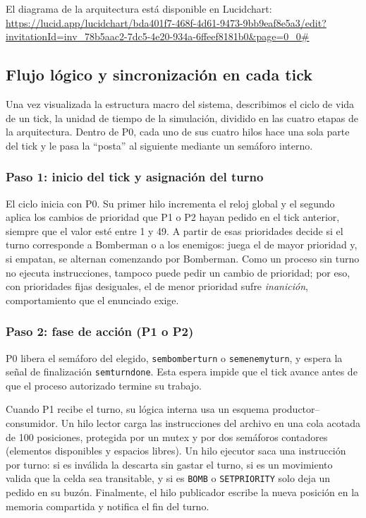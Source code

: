 \documentclass[11pt,a4paper]{article}
\newcommand{\cod}[1]{\texttt{#1}}
\renewcommand{\_}{\textunderscore\allowbreak}
\begin{document}
El diagrama de la arquitectura está disponible en Lucidchart:\\
\small\url{https://lucid.app/lucidchart/bda401f7-468f-4d61-9473-9bb9eaf8e5a3/edit?invitationId=inv_78b5aac2-7dc5-4e20-934a-6ffeef8181b0&page=0_0#}\normalsize

\subsection{Flujo lógico y sincronización en cada tick}

Una vez visualizada la estructura macro del sistema, describimos el ciclo de vida de un tick, la unidad de tiempo de la simulación, dividido en las cuatro etapas de la arquitectura. Dentro de P0, cada uno de sus cuatro hilos hace una sola parte del tick y le pasa la ``posta'' al siguiente mediante un semáforo interno.

\subsubsection{Paso 1: inicio del tick y asignación del turno}
El ciclo inicia con P0. Su primer hilo incrementa el reloj global y el segundo aplica los cambios de prioridad que P1 o P2 hayan pedido en el tick anterior, siempre que el valor esté entre 1 y 49. A partir de esas prioridades decide si el turno corresponde a Bomberman o a los enemigos: juega el de mayor prioridad y, si empatan, se alternan comenzando por Bomberman. Como un proceso sin turno no ejecuta instrucciones, tampoco puede pedir un cambio de prioridad; por eso, con prioridades fijas desiguales, el de menor prioridad sufre \emph{inanición}, comportamiento que el enunciado exige.

\subsubsection{Paso 2: fase de acción (P1 o P2)}
P0 libera el semáforo del elegido, \cod{sem\_bomber\_turn} o \cod{sem\_enemy\_turn}, y espera la señal de finalización \cod{sem\_turn\_done}. Esta espera impide que el tick avance antes de que el proceso autorizado termine su trabajo.

Cuando P1 recibe el turno, su lógica interna usa un esquema productor--consumidor. Un hilo lector carga las instrucciones del archivo en una cola acotada de 100 posiciones, protegida por un mutex y por dos semáforos contadores (elementos disponibles y espacios libres). Un hilo ejecutor saca una instrucción por turno: si es inválida la descarta sin gastar el turno, si es un movimiento valida que la celda sea transitable, y si es \cod{BOMB} o \cod{SET\_PRIORITY} solo deja un pedido en su buzón. Finalmente, el hilo publicador escribe la nueva posición en la memoria compartida y notifica el fin del turno.
\end{document}
